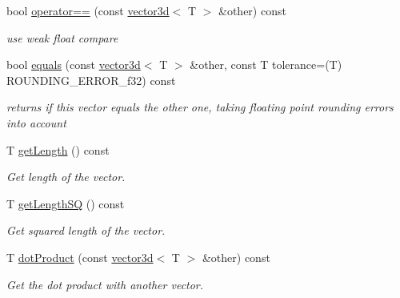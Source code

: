 \begin{DoxyCompactItemize}
\mbox{\label{classirr_1_1core_1_1vector3d_afd6ef83df8148b84a2220abb4847972f}} 
bool \hyperlink{classirr_1_1core_1_1vector3d_afd6ef83df8148b84a2220abb4847972f}{operator==} (const \hyperlink{classirr_1_1core_1_1vector3d}{vector3d}$<$ T $>$ \&other) const
\begin{DoxyCompactList}\small\item\em use weak float compare \end{DoxyCompactList}\item 
\mbox{\label{classirr_1_1core_1_1vector3d_a5d0853fe269182d76502724566db429e}} 
bool \hyperlink{classirr_1_1core_1_1vector3d_a5d0853fe269182d76502724566db429e}{equals} (const \hyperlink{classirr_1_1core_1_1vector3d}{vector3d}$<$ T $>$ \&other, const T tolerance=(T) R\+O\+U\+N\+D\+I\+N\+G\+\_\+\+E\+R\+R\+O\+R\+\_\+f32) const
\begin{DoxyCompactList}\small\item\em returns if this vector equals the other one, taking floating point rounding errors into account \end{DoxyCompactList}\item 
\mbox{\label{classirr_1_1core_1_1vector3d_a7f1d3aec798edf0b2c34594c7260ad0e}} 
T \hyperlink{classirr_1_1core_1_1vector3d_a7f1d3aec798edf0b2c34594c7260ad0e}{get\+Length} () const
\begin{DoxyCompactList}\small\item\em Get length of the vector. \end{DoxyCompactList}\item 
T \hyperlink{classirr_1_1core_1_1vector3d_a480a5d34b0ebaa39b5da403249746cf0}{get\+Length\+SQ} () const
\begin{DoxyCompactList}\small\item\em Get squared length of the vector. \end{DoxyCompactList}\item 
\mbox{\label{classirr_1_1core_1_1vector3d_ae220d3f24173601c5957961382588394}} 
T \hyperlink{classirr_1_1core_1_1vector3d_ae220d3f24173601c5957961382588394}{dot\+Product} (const \hyperlink{classirr_1_1core_1_1vector3d}{vector3d}$<$ T $>$ \&other) const
\begin{DoxyCompactList}\small\item\em Get the dot product with another vector. \end{DoxyCompactList}\item 

\end{DoxyCompactItemize}
